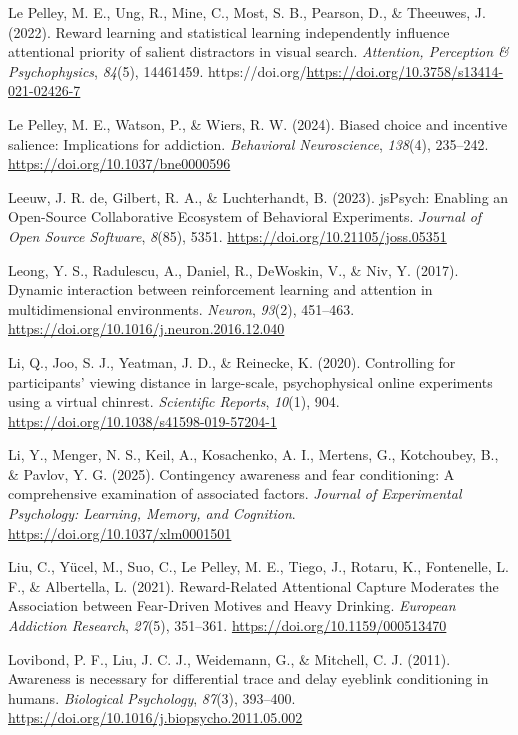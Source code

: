 \documentclass[
  man,
  floatsintext,
  longtable,
  nolmodern,
  notxfonts,
  notimes,
  mask,
  colorlinks=true,linkcolor=blue,citecolor=blue,urlcolor=blue]{apa7}
\newlength{\cslhangindent}
\newenvironment{CSLReferences}[2] %
 {\begin{list}{}{%
  \setlength{\itemindent}{0pt}
  \setlength{\leftmargin}{0pt}
  \setlength{\parsep}{0pt}
  \ifodd #1
   \setlength{\leftmargin}{\cslhangindent}
   \setlength{\itemindent}{-1\cslhangindent}
  \fi
  \setlength{\itemsep}{#2\baselineskip}}}
 {\end{list}}
\begin{document}
\begin{CSLReferences}{1}{0}
Le Pelley, M. E., Ung, R., Mine, C., Most, S. B., Pearson, D., \&
Theeuwes, J. (2022). Reward learning and statistical learning
independently influence attentional priority of salient distractors in
visual search. \emph{Attention, Perception \& Psychophysics},
\emph{84}(5), 14461459.
https://doi.org/\url{https://doi.org/10.3758/s13414-021-02426-7}

Le Pelley, M. E., Watson, P., \& Wiers, R. W. (2024). Biased choice and
incentive salience: Implications for addiction. \emph{Behavioral
Neuroscience}, \emph{138}(4), 235--242.
\url{https://doi.org/10.1037/bne0000596}

Leeuw, J. R. de, Gilbert, R. A., \& Luchterhandt, B. (2023). jsPsych:
Enabling an Open-Source Collaborative Ecosystem of Behavioral
Experiments. \emph{Journal of Open Source Software}, \emph{8}(85), 5351.
\url{https://doi.org/10.21105/joss.05351}

Leong, Y. S., Radulescu, A., Daniel, R., DeWoskin, V., \& Niv, Y.
(2017). Dynamic interaction between reinforcement learning and attention
in multidimensional environments. \emph{Neuron}, \emph{93}(2), 451--463.
\url{https://doi.org/10.1016/j.neuron.2016.12.040}

Li, Q., Joo, S. J., Yeatman, J. D., \& Reinecke, K. (2020). Controlling
for participants{'} viewing distance in large-scale, psychophysical
online experiments using a virtual chinrest. \emph{Scientific Reports},
\emph{10}(1), 904. \url{https://doi.org/10.1038/s41598-019-57204-1}

Li, Y., Menger, N. S., Keil, A., Kosachenko, A. I., Mertens, G.,
Kotchoubey, B., \& Pavlov, Y. G. (2025). Contingency awareness and fear
conditioning: {A} comprehensive examination of associated factors.
\emph{Journal of Experimental Psychology: Learning, Memory, and
Cognition}. \url{https://doi.org/10.1037/xlm0001501}

Liu, C., Yücel, M., Suo, C., Le Pelley, M. E., Tiego, J., Rotaru, K.,
Fontenelle, L. F., \& Albertella, L. (2021). Reward-Related Attentional
Capture Moderates the Association between Fear-Driven Motives and Heavy
Drinking. \emph{European Addiction Research}, \emph{27}(5), 351--361.
\url{https://doi.org/10.1159/000513470}

Lovibond, P. F., Liu, J. C. J., Weidemann, G., \& Mitchell, C. J.
(2011). Awareness is necessary for differential trace and delay eyeblink
conditioning in humans. \emph{Biological Psychology}, \emph{87}(3),
393--400. \url{https://doi.org/10.1016/j.biopsycho.2011.05.002}


\end{CSLReferences}
\end{document}
